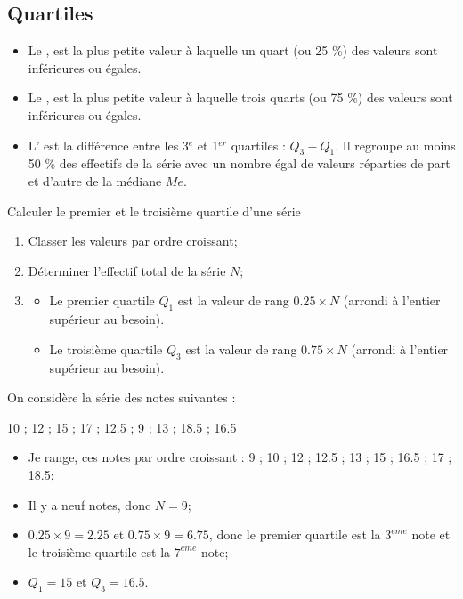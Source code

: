 \documentclass[12pt,a4paper]{article}
\begin{document}
\subsection{Quartiles}

\begin{mydef}
	\begin{itemize}
		\item Le , est la plus petite valeur à laquelle un quart (ou 25 \%) des valeurs sont inférieures ou égales.
		\item Le , est la plus petite valeur à laquelle trois quarts (ou 75 \%) des valeurs sont inférieures ou égales.
		\item L' est la différence entre les 3$^e$ et 1$^{er}$ quartiles : $Q_3 - Q_1$. Il regroupe au moins 50 \% des effectifs de la série avec un nombre égal de valeurs réparties de part et d'autre de la médiane $Me$.
	\end{itemize}
	
\end{mydef}	

\begin{mymeth}{Calculer le premier et le troisième quartile d'une série}
	\begin{enumerate}
		\item Classer les valeurs par ordre croissant;
		\item Déterminer l'effectif total de la série $N$;
		\item 
		\begin{itemize}
			\item Le premier quartile $Q_1$ est la valeur de rang $\num{0.25} \times N$ (arrondi à l'entier supérieur au besoin).
			\item Le troisième quartile $Q_3$ est la valeur de rang $\num{0.75} \times N$ (arrondi à l'entier supérieur au besoin).
		\end{itemize} 
		
	\end{enumerate}
\end{mymeth}

\begin{myex}
On considère la série des notes suivantes : 
		
		\num{10} ; \num{12} ; \num{15} ; \num{17} ; \num{12.5} ; \num{9} ; \num{13} ; \num{18.5} ; \num{16.5}
		
		\begin{itemize}
			\item Je range, ces notes par ordre croissant :
			\num{9} ; \num{10} ; \num{12} ; \num{12.5} ; \num{13} ; \num{15} ; \num{16.5} ; \num{17} ; \num{18.5};
			
			\item Il y a neuf notes, donc $N = 9$;
			\item $\num{0.25} \times 9 = \num{2.25}$ et $\num{0.75} \times 9 = \num{6.75}$, donc le premier quartile est la $3^{eme}$ note et le troisième quartile est la $7^{eme}$ note;
			\item $Q_1 = 15$ et $Q_3 = \num{16.5}$.
		\end{itemize}
		
	
\end{myex}
\end{document}
